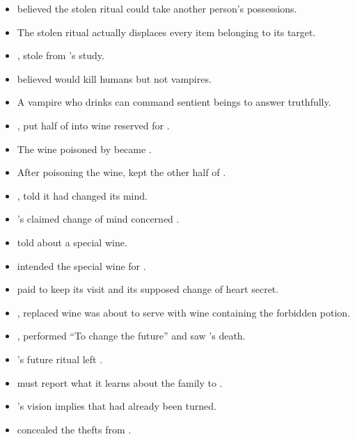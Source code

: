 \begin{itemize}
  \item {} believed the stolen ritual could take another person's possessions.
  \item The stolen ritual actually displaces every item belonging to its target.
  \item {},  stole  from 's study.
  \item {} believed  would kill humans but not vampires.
  \item A vampire who drinks  can command sentient beings to answer truthfully.
  \item {},  put half of  into wine reserved for .
  \item The wine poisoned by  became .
  \item After poisoning the wine,  kept the other half of .
  \item {},  told  it had changed its mind.
  \item {}'s claimed change of mind concerned .
  \item {} told  about a special wine.
  \item {} intended the special wine for .
  \item {} paid  to keep its visit and its supposed change of heart secret.
  \item {},  replaced wine  was about to serve with wine containing the forbidden potion.
  \item {},  performed ``To change the future'' and saw 's death.
  \item {}'s future ritual left .
  \item {} must report what it learns about the family to .
  \item {}'s vision implies that  had already been turned.
  \item {} concealed the thefts from .

\end{itemize}
